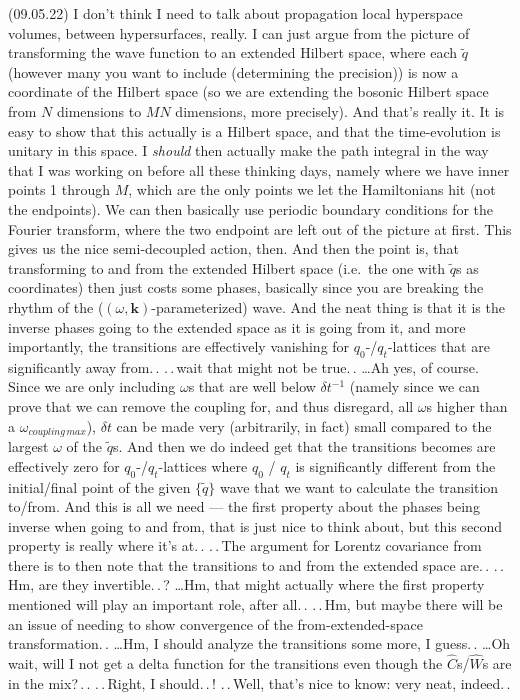 \documentclass{report}
\begin{document}
(09.05.22) I don't think I need to talk about propagation local hyperspace volumes, between hypersurfaces, really. I can just argue from the picture of transforming the wave function to an extended Hilbert space, where each $\tilde q$ (however many you want to include (determining the precision)) is now a coordinate of the Hilbert space (so we are extending the bosonic Hilbert space from $N$ dimensions to $M N$ dimensions, more precisely). And that's really it. It is easy to show that this actually is a Hilbert space, and that the time-evolution is unitary in this space. I \emph{should} then actually make the path integral in the way that I was working on before all these thinking days, namely where we have inner points 1 through $M$, which are the only points we let the Hamiltonians hit (not the endpoints). We can then basically use periodic boundary conditions for the Fourier transform, where the two endpoint are left out of the picture at first. This gives us the nice semi-decoupled action, then. And then the point is, that transforming to and from the extended Hilbert space (i.e.\ the one with $\tilde q$s as coordinates) then just costs some phases, basically since you are breaking the rhythm of the ($(\omega, \boldsymbol{k})$-parameterized) wave. And the neat thing is that it is the inverse phases going to the extended space as it is going from it, and more importantly, the transitions are effectively vanishing for $q_0$-/$q_t$-lattices that are significantly away from.\,. .\,.\,wait that might not be true.\,. 
\ldots Ah yes, of course. Since we are only including $\omega$s that are well below $\delta t^{-1}$ (namely since we can prove that we can remove the coupling for, and thus disregard, all $\omega$s higher than a $\omega_{coupling\, max}$), $\delta t$ can be made very (arbitrarily, in fact) small compared to the largest $\omega$ of the $\tilde q$s. And then we do indeed get that the transitions becomes are effectively zero for $q_0$-/$q_t$-lattices where $q_0$ / $q_t$ is significantly different from the initial/final point of the given $\{\tilde q\}$ wave that we want to calculate the transition to/from. %
And this is all we need --- the first property about the phases being inverse when going to and from, that is just nice to think about, but this second property is really where it's at.\,. .\,.\,The argument for Lorentz covariance from there is to then note that the transitions to and from the extended space are.\,. .\,.\,Hm, are they invertible.\,.\,? %
\ldots Hm, that might actually where the first property mentioned will play an important role, after all.\,. .\,.\,Hm, but maybe there will be an issue of needing to show convergence of the from-extended-space transformation.\,. \ldots Hm, I should analyze the transitions some more, I guess.\,. \ldots Oh wait, will I not get a delta function for the transitions even though the $\hat C$s/$\hat W$s are in the mix?\,.\,. .\,.\,Right, I should.\,.\,! .\,.\,Well, that's nice to know: very neat, indeed.\,. %
\end{document}
